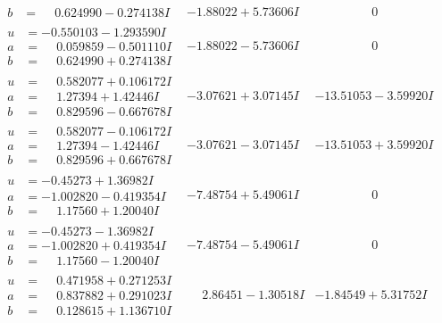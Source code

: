 \documentclass[1p]{elsarticle_modified}
\theoremstyle{definition}
\begin{document}
$$\begin{array}{c|c|c}
\begin{aligned}
b &= \phantom{-}0.624990 - 0.274138 I\end{aligned}
 & -1.88022 + 5.73606 I & \phantom{-0.000000 } 0 \\ \hline\begin{aligned}
u &= -0.550103 - 1.293590 I \\
a &= \phantom{-}0.059859 - 0.501110 I \\
b &= \phantom{-}0.624990 + 0.274138 I\end{aligned}
 & -1.88022 - 5.73606 I & \phantom{-0.000000 } 0 \\ \hline\begin{aligned}
u &= \phantom{-}0.582077 + 0.106172 I \\
a &= \phantom{-}1.27394 + 1.42446 I \\
b &= \phantom{-}0.829596 - 0.667678 I\end{aligned}
 & -3.07621 + 3.07145 I & -13.51053 - 3.59920 I \\ \hline\begin{aligned}
u &= \phantom{-}0.582077 - 0.106172 I \\
a &= \phantom{-}1.27394 - 1.42446 I \\
b &= \phantom{-}0.829596 + 0.667678 I\end{aligned}
 & -3.07621 - 3.07145 I & -13.51053 + 3.59920 I \\ \hline\begin{aligned}
u &= -0.45273 + 1.36982 I \\
a &= -1.002820 - 0.419354 I \\
b &= \phantom{-}1.17560 + 1.20040 I\end{aligned}
 & -7.48754 + 5.49061 I & \phantom{-0.000000 } 0 \\ \hline\begin{aligned}
u &= -0.45273 - 1.36982 I \\
a &= -1.002820 + 0.419354 I \\
b &= \phantom{-}1.17560 - 1.20040 I\end{aligned}
 & -7.48754 - 5.49061 I & \phantom{-0.000000 } 0 \\ \hline\begin{aligned}
u &= \phantom{-}0.471958 + 0.271253 I \\
a &= \phantom{-}0.837882 + 0.291023 I \\
b &= \phantom{-}0.128615 + 1.136710 I\end{aligned}
 & \phantom{-}2.86451 - 1.30518 I & -1.84549 + 5.31752 I \\ \hline\begin{aligned}

\end{aligned}
\end{array}$$
\end{document}
